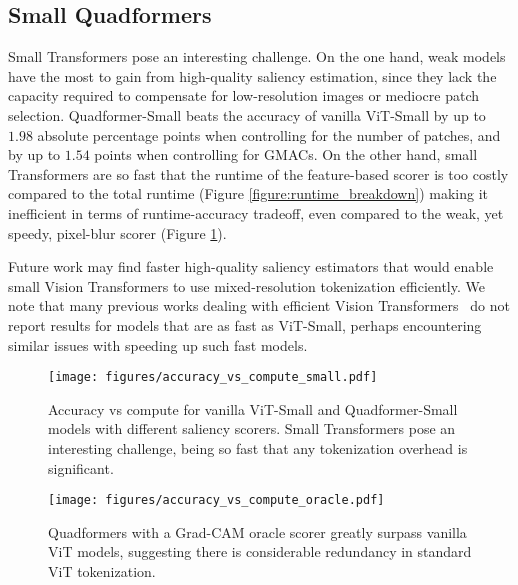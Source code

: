 \subsection{Small Quadformers}
Small Transformers pose an interesting challenge. On the one hand, weak models have the most to gain from high-quality saliency estimation, since they lack the capacity required to compensate for low-resolution images or mediocre patch selection. Quadformer-Small beats the accuracy of vanilla ViT-Small by up to $1.98$ absolute percentage points when controlling for the number of patches, and by up to $1.54$ points when controlling for GMACs. On the other hand, small Transformers are so fast that the runtime of the feature-based scorer is too costly compared to the total runtime (Figure \ref{figure:runtime_breakdown}) making it inefficient in terms of runtime-accuracy tradeoff, even compared to the weak, yet speedy, pixel-blur scorer (Figure \ref{figure:accuracy_vs_compute_small}).

Future work may find faster high-quality saliency estimators that would enable small Vision Transformers to use mixed-resolution tokenization efficiently. We note that many previous works dealing with efficient Vision Transformers~\cite{Arar2021LearnedQF,Liu2021SwinTH,Tu2022MaxViTMV,Meng2021AdaViTAV} do not report results for models that are as fast as ViT-Small, perhaps encountering similar issues with speeding up such fast models.


\begin{figure}[t!]
\vspace*{-8pt}
\centering
\hspace*{-0.035\linewidth}
\texttt{[image: figures/accuracy\_vs\_compute\_small.pdf]}
\caption{Accuracy vs compute for vanilla ViT-Small and Quadformer-Small models with different saliency scorers. Small Transformers pose an interesting challenge, being so fast that any tokenization overhead is significant.}
\label{figure:accuracy_vs_compute_small}
\end{figure}

\begin{figure}[t!]
\vspace*{-2pt}
\centering
\texttt{[image: figures/accuracy\_vs\_compute\_oracle.pdf]}
\caption{Quadformers with a Grad-CAM oracle scorer greatly surpass vanilla ViT models, suggesting there is considerable redundancy in standard ViT tokenization.}
\label{figure:oracle}
\vspace*{10pt}
\end{figure}
